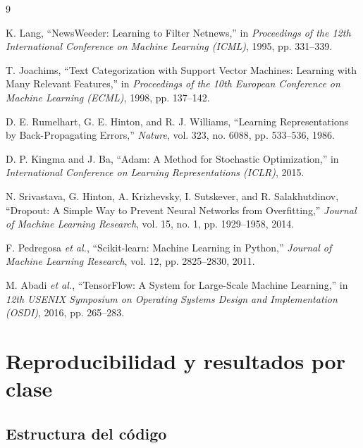 \documentclass[11pt,letterpaper]{article}
\begin{document}
\begin{thebibliography}{9}

K. Lang, ``NewsWeeder: Learning to Filter Netnews,'' in \textit{Proceedings of the 12th International Conference on Machine Learning (ICML)}, 1995, pp. 331--339.

T. Joachims, ``Text Categorization with Support Vector Machines: Learning with Many Relevant Features,'' in \textit{Proceedings of the 10th European Conference on Machine Learning (ECML)}, 1998, pp. 137--142.

D. E. Rumelhart, G. E. Hinton, and R. J. Williams, ``Learning Representations by Back-Propagating Errors,'' \textit{Nature}, vol. 323, no. 6088, pp. 533--536, 1986.

D. P. Kingma and J. Ba, ``Adam: A Method for Stochastic Optimization,'' in \textit{International Conference on Learning Representations (ICLR)}, 2015.

N. Srivastava, G. Hinton, A. Krizhevsky, I. Sutskever, and R. Salakhutdinov, ``Dropout: A Simple Way to Prevent Neural Networks from Overfitting,'' \textit{Journal of Machine Learning Research}, vol. 15, no. 1, pp. 1929--1958, 2014.

F. Pedregosa \textit{et al.}, ``Scikit-learn: Machine Learning in Python,'' \textit{Journal of Machine Learning Research}, vol. 12, pp. 2825--2830, 2011.

M. Abadi \textit{et al.}, ``TensorFlow: A System for Large-Scale Machine Learning,'' in \textit{12th USENIX Symposium on Operating Systems Design and Implementation (OSDI)}, 2016, pp. 265--283.

\end{thebibliography}

\newpage
\appendix
\section{Reproducibilidad y resultados por clase}\label{ap:repro}

\subsection*{Estructura del código}
\end{document}
